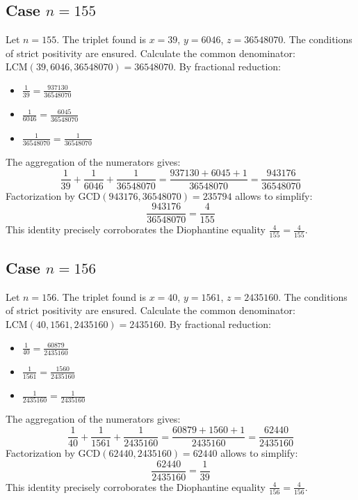 \documentclass[11pt,a4paper]{article}
\begin{document}
\subsection{Case $n = 155$}
Let $n = 155$. The triplet found is $x = 39$, $y = 6046$, $z = 36548070$.
The conditions of strict positivity are ensured.
Calculate the common denominator: $\text{LCM}(39, 6046, 36548070) = 36548070$.
By fractional reduction:
\begin{itemize}
    \item $\frac{1}{39} = \frac{937130}{36548070}$
    \item $\frac{1}{6046} = \frac{6045}{36548070}$
    \item $\frac{1}{36548070} = \frac{1}{36548070}$
\end{itemize}
The aggregation of the numerators gives:
$$ \frac{1}{39} + \frac{1}{6046} + \frac{1}{36548070} = \frac{937130 + 6045 + 1}{36548070} = \frac{943176}{36548070} $$
Factorization by $\text{GCD}(943176, 36548070) = 235794$ allows to simplify:
$$ \frac{943176}{36548070} = \frac{4}{155} $$
This identity precisely corroborates the Diophantine equality $\frac{4}{155} = \frac{4}{155}$.

\subsection{Case $n = 156$}
Let $n = 156$. The triplet found is $x = 40$, $y = 1561$, $z = 2435160$.
The conditions of strict positivity are ensured.
Calculate the common denominator: $\text{LCM}(40, 1561, 2435160) = 2435160$.
By fractional reduction:
\begin{itemize}
    \item $\frac{1}{40} = \frac{60879}{2435160}$
    \item $\frac{1}{1561} = \frac{1560}{2435160}$
    \item $\frac{1}{2435160} = \frac{1}{2435160}$
\end{itemize}
The aggregation of the numerators gives:
$$ \frac{1}{40} + \frac{1}{1561} + \frac{1}{2435160} = \frac{60879 + 1560 + 1}{2435160} = \frac{62440}{2435160} $$
Factorization by $\text{GCD}(62440, 2435160) = 62440$ allows to simplify:
$$ \frac{62440}{2435160} = \frac{1}{39} $$
This identity precisely corroborates the Diophantine equality $\frac{4}{156} = \frac{4}{156}$.
\end{document}
